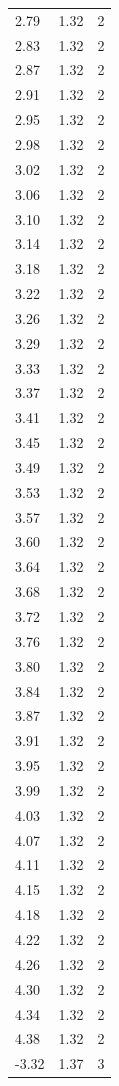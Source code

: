 \begin{longtable}{lrr}
  2.79 & 1.32 & 2 \\
  2.83 & 1.32 & 2 \\
  2.87 & 1.32 & 2 \\
  2.91 & 1.32 & 2 \\
  2.95 & 1.32 & 2 \\
  2.98 & 1.32 & 2 \\
  3.02 & 1.32 & 2 \\
  3.06 & 1.32 & 2 \\
  3.10 & 1.32 & 2 \\
  3.14 & 1.32 & 2 \\
  3.18 & 1.32 & 2 \\
  3.22 & 1.32 & 2 \\
  3.26 & 1.32 & 2 \\
  3.29 & 1.32 & 2 \\
  3.33 & 1.32 & 2 \\
  3.37 & 1.32 & 2 \\
  3.41 & 1.32 & 2 \\
  3.45 & 1.32 & 2 \\
  3.49 & 1.32 & 2 \\
  3.53 & 1.32 & 2 \\
  3.57 & 1.32 & 2 \\
  3.60 & 1.32 & 2 \\
  3.64 & 1.32 & 2 \\
  3.68 & 1.32 & 2 \\
  3.72 & 1.32 & 2 \\
  3.76 & 1.32 & 2 \\
  3.80 & 1.32 & 2 \\
  3.84 & 1.32 & 2 \\
  3.87 & 1.32 & 2 \\
  3.91 & 1.32 & 2 \\
  3.95 & 1.32 & 2 \\
  3.99 & 1.32 & 2 \\
  4.03 & 1.32 & 2 \\
  4.07 & 1.32 & 2 \\
  4.11 & 1.32 & 2 \\
  4.15 & 1.32 & 2 \\
  4.18 & 1.32 & 2 \\
  4.22 & 1.32 & 2 \\
  4.26 & 1.32 & 2 \\
  4.30 & 1.32 & 2 \\
  4.34 & 1.32 & 2 \\
  4.38 & 1.32 & 2 \\
  -3.32 & 1.37 & 3 \\

\end{longtable}
